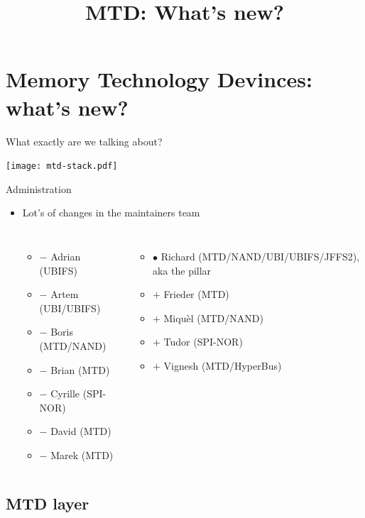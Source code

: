 \documentclass[aspectratio=169,obeyspaces,spaces,hyphens,dvipsnames]{beamer}
\title{MTD: What's new?}
\institute{Bootlin \hfill sigma star gmbh}
\begin{document}
\section{Memory Technology Devinces: what's new?}

\newcommand\added{\item[$+$]}
\newcommand\removed{\item[$-$]}
\newcommand\surviving{\item[$\bullet$]}

\begin{frame}{What exactly are we talking about?}
  \begin{center}
    \texttt{[image: mtd-stack.pdf]}
  \end{center}
\end{frame}

\begin{frame}{Administration}
  \begin{itemize}
  \item Lot's of changes in the maintainers team
    \begin{columns}
      \begin{itemize}
        \removed Adrian (UBIFS)
        \removed Artem (UBI/UBIFS)
        \removed Boris (MTD/NAND)
        \removed Brian (MTD)
        \removed Cyrille (SPI-NOR)
        \removed David (MTD)
        \removed Marek (MTD)
      \end{itemize}
      \begin{itemize}
        \surviving Richard (MTD/NAND/UBI/UBIFS/JFFS2), aka the pillar
        \added Frieder (MTD)
        \added Miquèl (MTD/NAND)
        \added Tudor (SPI-NOR)
        \added Vignesh (MTD/HyperBus)
      \end{itemize}
    \end{columns}
  \end{itemize}
\end{frame}

\subsection{MTD layer}
\end{document}
